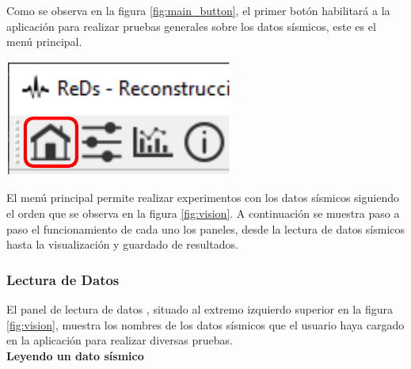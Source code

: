 \documentclass[12pt,twoside,letter]{ol-softwaremanual}
\newcommand*\circled[1]{\tikz[baseline=(char.base)]{
            \node[shape=circle,draw,inner sep=2pt] (char) {#1};}}
\newenvironment{Figure}
  {\par\medskip\noindent\minipage{\linewidth}}
  {\endminipage\par\medskip}
\begin{document}
\begin{multicols}{2}

Como se observa en la figura \ref{fig:main_button}, el primer botón habilitará a la aplicación para realizar pruebas generales sobre los datos sísmicos, este es el menú principal.

\begin{Figure}
    \centering
    \includegraphics[width=0.4\linewidth]{single-tab}
    \label{fig:main_button}
\end{Figure}

\end{multicols}

El menú principal permite realizar experimentos con los datos sísmicos siguiendo el orden que se observa en la figura \ref{fig:vision}. A continuación se muestra paso a paso el funcionamiento de cada uno los paneles, desde la lectura de datos sísmicos hasta la visualización y guardado de resultados.

\subsubsection{Lectura de Datos}

El panel de lectura de datos \circled{2}, situado al extremo izquierdo superior en la figura \ref{fig:vision}, muestra los nombres de los datos sísmicos que el usuario haya cargado en la aplicación para realizar diversas pruebas.\\

\textbf{Leyendo un dato sísmico} \label{sec:data_lecture}
\end{document}
